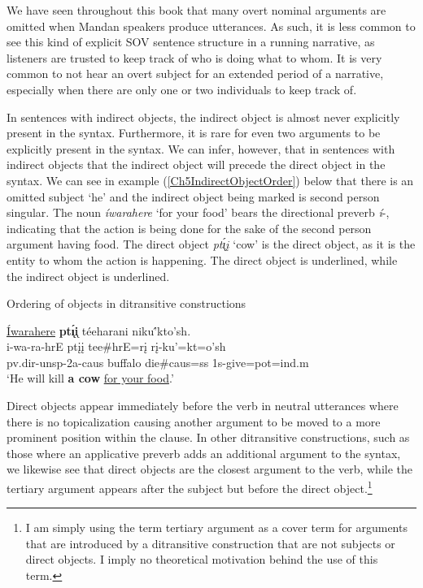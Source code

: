 We have seen throughout this book that many overt nominal arguments are omitted when Mandan speakers produce utterances. As such, it is less common to see this kind of explicit SOV sentence structure in a running narrative, as listeners are trusted to keep track of who is doing what to whom. It is very common to not hear an overt subject for an extended period of a narrative, especially when there are only one or two individuals to keep track of.

In sentences with indirect objects, the indirect object is almost never explicitly present in the syntax. Furthermore, it is rare for even two arguments to be explicitly present in the syntax. We can infer, however, that in sentences with indirect objects that the indirect object will precede the direct object in the syntax. We can see in example (\ref{Ch5IndirectObjectOrder}) below that there is an omitted subject `he' and the indirect object being marked is second person singular. The noun \textit{íwarahere} `for your food' bears the directional preverb \textit{í}-, indicating that the action is being done for the sake of the second person argument having food. The direct object \textit{pt\'{ı̨}į} `cow' is the direct object, as it is the entity to whom the action is happening. The direct object is underlined, while the indirect object is underlined.

\begin{exe}
\item\label{Ch5IndirectObjectOrder} Ordering of objects in ditransitive constructions

\glll \uline{Íwarahere} \textbf{pt\'{ı̨}i}̨ téeharani niku'́kto'sh.\\
i-wa-ra-hrE ptįį tee\#hrE=rį rį-ku'=kt=o'sh\\
pv.dir-unsp-2a-caus \textnormal{buffalo} \textnormal{die}\#caus=ss 1s-\textnormal{give}=pot=ind.m\\
\glt `He will kill \textbf{a cow} \uline{for your food}.' \citep[60]{hollow1973a}
\end{exe}

Direct objects appear immediately before the verb in neutral utterances where there is no topicalization causing another argument to be moved to a more prominent position within the clause. In other ditransitive constructions, such as those where an applicative preverb adds an additional argument to the syntax, we likewise see that direct objects are the closest argument to the verb, while the tertiary argument appears after the subject but before the direct object.\footnote{I am simply using the term tertiary argument as a cover term for arguments that are introduced by a ditransitive construction that are not subjects or direct objects. I imply no theoretical motivation behind the use of this term.} 

